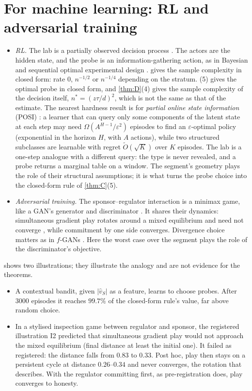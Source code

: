 \documentclass[11pt]{article}
\theoremstyle{definition}\newtheorem{definition}{Definition}\newtheorem{remark}{Remark}
\begin{document}
\section{For machine learning: RL and adversarial training}\label{sec:ml}
\begin{itemize}
\item \emph{RL.} The lab is a partially observed decision process \cite{KaelblingLittmanCassandra1998}. The actors are the hidden state,
  and the probe is an information-gathering action, as in Bayesian and sequential optimal experimental design
  \cite{Lindley1956,ChalonerVerdinelli1995,ShenDongHuan2023}.  gives the sample complexity in closed form: rate $0$, $n^{-1/2}$
  or $n^{-1/4}$ depending on the stratum. (5) gives the optimal probe in closed form, and \cref{thm:D}(4) gives the sample complexity of the decision itself,
  $n^*=(z\tau/d)^2$, which is not the same as that of the estimate.
  The nearest hardness result is for \emph{partial online state information} (POSI) \cite{ShiLiangShroff2023}: a learner that can query
  only some components of the latent state at each step may need $\Omega(A^{H-1}/\varepsilon^2)$ episodes to find an
  $\varepsilon$-optimal policy (exponential in the horizon $H$, with $A$ actions), while two structured subclasses are learnable with
  regret $\tilde O(\sqrt K)$ over $K$ episodes. The lab is a one-step analogue with a different query: the type is never revealed, and a
  probe returns a marginal table on a window. The segment's geometry plays the role of their structural assumptions; it is what turns
  the probe choice into the closed-form rule of \cref{thm:C}(5).
\item \emph{Adversarial training.} The sponsor--regulator interaction is a minimax game, like a GAN's generator and discriminator
  \cite{Goodfellow2014}. It shares their dynamics: simultaneous gradient play rotates around a mixed equilibrium and need not converge
  \cite{Mescheder2018}, while commitment by one side converges. Divergence choice matters as in $f$-GANs
  \cite{Nowozin2016}. Here the worst case over the segment plays the role of the discriminator's objective.
\end{itemize}
 shows two illustrations; they illustrate the analogy and are not evidence for the theorems.
\begin{itemize}
\item A contextual bandit, given $|\hat v_S|$ as a feature, learns to choose probes. After 3000 episodes it reaches $99.7\%$ of the
  closed-form rule's value, far above random choice.
\item In a stylised inspection game between regulator and sponsor, the registered illustration I2 predicted that simultaneous gradient play
  would not approach the mixed equilibrium (final distance at least the initial one). It failed as registered: the distance falls from
  $0.83$ to $0.33$. Post hoc, play then stays on a persistent cycle at distance $0.26$--$0.34$ and never converges, the rotation that
  \cite{Mescheder2018} describes. With the regulator committing first, as
  pre-registration does, play converges to honesty.
\end{itemize}
\end{document}
